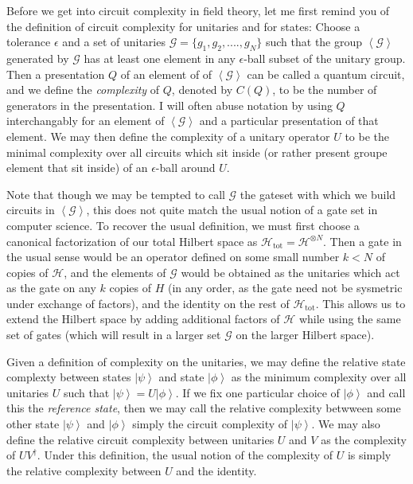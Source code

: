 \documentclass[12pt]{amsart}
\newcommand{\ket}[1]{\left| #1 \right>}
\newcommand{\expVal}[1]{\left< #1 \right>}
\begin{document}
Before we get into circuit complexity in field theory, let me first remind you of the definition of circuit complexity for unitaries and for states: Choose a tolerance $\epsilon$ and a set of unitaries $\mathcal{G} = \{g_1, g_2, ...., g_N\}$ such that the group $\expVal{\mathcal{G}}$ generated by $\mathcal{G}$ has at least one element in any $\epsilon$-ball subset of the unitary group. Then a presentation $Q$ of an element of of $\expVal{\mathcal{G}}$ can be called a quantum circuit, and we define the {\it complexity} of $Q$, denoted by $C(Q)$, to be the number of generators in the presentation. I will often abuse notation by using $Q$ interchangably for an element of $\expVal{\mathcal{G}}$ and a particular presentation of that element. We may then define the complexity of a unitary operator $U$ to be the minimal complexity over all circuits which sit inside (or rather present groupe element that sit inside) of an $\epsilon$-ball around $U$.

Note that though we may be tempted to call $\mathcal{G}$ the gateset with which we build circuits in $\expVal{\mathcal{G}}$, this does not quite match the usual notion of a gate set in computer science. To recover the usual definition, we must first choose a canonical factorization of our total Hilbert space as $\mathcal{H}_{\text{tot}} = \mathcal{H}^{\otimes N}$. Then a gate in the usual sense would be an operator defined on some small number $k < N$ of copies of $\mathcal{H}$, and the elements of $\mathcal{G}$ would be obtained as the unitaries which act as the gate on any $k$ copies of $H$ (in any order, as the gate need not be sysmetric under exchange of factors), and the identity on the rest of $\mathcal{H}_{\text{tot}}$. This allows us to extend the Hilbert space by adding additional factors of $\mathcal{H}$ while using the same set of gates (which will result in a larger set $\mathcal{G}$ on the larger Hilbert space).

Given a definition of complexity on the unitaries, we may define the relative state complexty between states $\ket{\psi}$ and state $\ket{\phi}$ as the minimum complexity over all unitaries $U$ such that $\ket{\psi} = U \ket{\phi}$. If we fix one particular choice of $\ket{\phi}$ and call this the {\it reference state}, then we may call the relative complexity betwween some other state $\ket{\psi}$ and $\ket{\phi}$ simply the circuit complexity of $\ket{\psi}$. We may also define the relative circuit complexity between unitaries $U$ and $V$ as the complexity of $UV^{\dagger}$. Under this definition, the usual notion of the complexity of $U$ is simply the relative complexity between $U$ and the identity.
\end{document}
